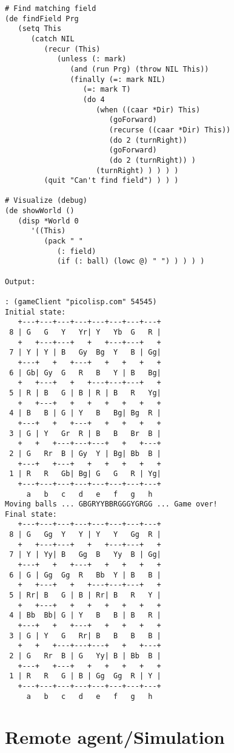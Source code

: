 \begin{verbatim}
# Find matching field
(de findField Prg
   (setq This
      (catch NIL
         (recur (This)
            (unless (: mark)
               (and (run Prg) (throw NIL This))
               (finally (=: mark NIL)
                  (=: mark T)
                  (do 4
                     (when ((caar *Dir) This)
                        (goForward)
                        (recurse ((caar *Dir) This))
                        (do 2 (turnRight))
                        (goForward)
                        (do 2 (turnRight)) )
                     (turnRight) ) ) ) )
         (quit "Can't find field") ) ) )

# Visualize (debug)
(de showWorld ()
   (disp *World 0
      '((This)
         (pack " "
            (: field)
            (if (: ball) (lowc @) " ") ) ) ) )

Output:

: (gameClient "picolisp.com" 54545)
Initial state:
   +---+---+---+---+---+---+---+---+
 8 | G   G   Y   Yr| Y   Yb  G   R |
   +   +---+---+   +   +---+---+   +
 7 | Y | Y | B   Gy  Bg  Y   B | Gg|
   +---+   +   +---+   +   +   +   +
 6 | Gb| Gy  G   R   B   Y | B   Bg|
   +   +---+   +   +---+---+---+   +
 5 | R | B   G | B | R | B   R   Yg|
   +   +---+   +   +   +   +   +   +
 4 | B   B | G | Y   B   Bg| Bg  R |
   +---+   +   +---+   +   +   +   +
 3 | G | Y   Gr  R | B   B   Br  B |
   +   +   +---+---+---+   +   +---+
 2 | G   Rr  B | Gy  Y | Bg| Bb  B |
   +---+   +---+   +   +   +   +   +
 1 | R   R   Gb| Bg| G   G   R | Yg|
   +---+---+---+---+---+---+---+---+
     a   b   c   d   e   f   g   h
Moving balls ... GBGRYYBBRGGGYGRGG ... Game over!
Final state:
   +---+---+---+---+---+---+---+---+
 8 | G   Gg  Y   Y | Y   Y   Gg  R |
   +   +---+---+   +   +---+---+   +
 7 | Y | Yy| B   Gg  B   Yy  B | Gg|
   +---+   +   +---+   +   +   +   +
 6 | G | Gg  Gg  R   Bb  Y | B   B |
   +   +---+   +   +---+---+---+   +
 5 | Rr| B   G | B | Rr| B   R   Y |
   +   +---+   +   +   +   +   +   +
 4 | Bb  Bb| G | Y   B   B | B   R |
   +---+   +   +---+   +   +   +   +
 3 | G | Y   G   Rr| B   B   B   B |
   +   +   +---+---+---+   +   +---+
 2 | G   Rr  B | G   Yy| B | Bb  B |
   +---+   +---+   +   +   +   +   +
 1 | R   R   G | B | Gg  Gg  R | Y |
   +---+---+---+---+---+---+---+---+
     a   b   c   d   e   f   g   h

\end{verbatim}

\section*{Remote agent/Simulation}

